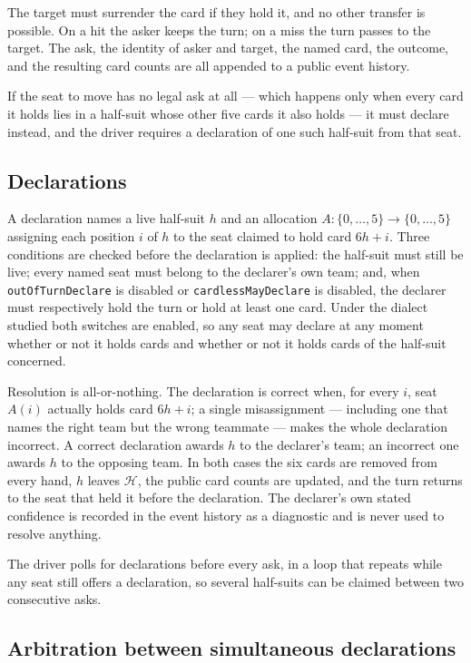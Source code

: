 \documentclass[11pt]{article}
\theoremstyle{definition}
\begin{document}
The target must surrender the card if they hold it, and no other transfer is
possible. On a hit the asker keeps the turn; on a miss the turn passes to the
target. The ask, the identity of asker and target, the named card, the outcome,
and the resulting card counts are all appended to a public event history.

If the seat to move has no legal ask at all --- which happens only when every
card it holds lies in a half-suit whose other five cards it also holds --- it
must declare instead, and the driver requires a declaration of one such
half-suit from that seat.

\subsection{Declarations}
\label{app:dialect-declare}

A declaration names a live half-suit $h$ and an allocation
$A: \{0,\dots,5\} \to \{0,\dots,5\}$ assigning each position $i$ of $h$ to the
seat claimed to hold card $6h+i$. Three conditions are checked before the
declaration is applied: the half-suit must still be live; every named seat must
belong to the declarer's own team; and, when \texttt{outOfTurnDeclare} is
disabled or \texttt{cardlessMayDeclare} is disabled, the declarer must
respectively hold the turn or hold at least one card. Under the dialect studied
both switches are enabled, so any seat may declare at any moment whether or not
it holds cards and whether or not it holds cards of the half-suit concerned.

Resolution is all-or-nothing. The declaration is correct when, for every
$i$, seat $A(i)$ actually holds card $6h+i$; a single misassignment --- including
one that names the right team but the wrong teammate --- makes the whole
declaration incorrect. A correct declaration awards $h$ to the declarer's team;
an incorrect one awards $h$ to the opposing team. In both cases the six cards
are removed from every hand, $h$ leaves $\mathcal{H}$, the public card counts are
updated, and the turn returns to the seat that held it before the declaration.
The declarer's own stated confidence is recorded in the event history as a
diagnostic and is never used to resolve anything.

The driver polls for declarations before every ask, in a loop that repeats while
any seat still offers a declaration, so several half-suits can be claimed between
two consecutive asks.

\subsection{Arbitration between simultaneous declarations}
\label{app:dialect-arb}
\end{document}
